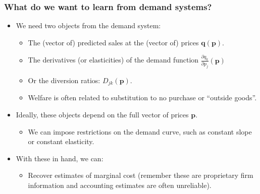 \documentclass[aspectratio=169,11pt]{beamer}
\begin{document}
\begin{frame}
\frametitle{What do we want to learn from demand systems?}
\begin{itemize}
\item We need two objects from the demand system:
\begin{itemize}
\item The (vector of) \alert{predicted sales} at the (vector of) prices $\symbf{q(p)}$.
\item The \alert{derivatives} (or elasticities) of the demand function  $\frac{\partial q_k}{\partial p_j}(\symbf{p})$
\item Or the \alert{diversion ratios}: $D_{jk}(\symbf{p})$.
\item Welfare is often related to substitution to no purchase or ``outside goods''.
\end{itemize}
\item Ideally, these objects depend on the full vector of prices $\symbf{p}$.
\begin{itemize}
\item We can impose restrictions on the demand curve, such as constant slope or constant elasticity.
\end{itemize}
\item With these in hand, we can:
\begin{itemize}
\item Recover estimates of marginal cost (remember these are proprietary firm information and accounting estimates are often unreliable).
\end{itemize}
\end{itemize}
\end{frame}
\end{document}
